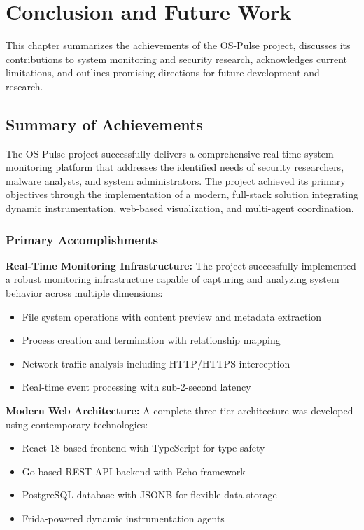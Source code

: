 \chapter{Conclusion and Future Work}

This chapter summarizes the achievements of the OS-Pulse project, discusses its contributions to system monitoring and security research, acknowledges current limitations, and outlines promising directions for future development and research.

\section{Summary of Achievements}

The OS-Pulse project successfully delivers a comprehensive real-time system monitoring platform that addresses the identified needs of security researchers, malware analysts, and system administrators. The project achieved its primary objectives through the implementation of a modern, full-stack solution integrating dynamic instrumentation, web-based visualization, and multi-agent coordination.

\subsection{Primary Accomplishments}

\textbf{Real-Time Monitoring Infrastructure:}
The project successfully implemented a robust monitoring infrastructure capable of capturing and analyzing system behavior across multiple dimensions:
\begin{itemize}
    \item File system operations with content preview and metadata extraction
    \item Process creation and termination with relationship mapping
    \item Network traffic analysis including HTTP/HTTPS interception
    \item Real-time event processing with sub-2-second latency
\end{itemize}

\textbf{Modern Web Architecture:}
A complete three-tier architecture was developed using contemporary technologies:
\begin{itemize}
    \item React 18-based frontend with TypeScript for type safety
    \item Go-based REST API backend with Echo framework
    \item PostgreSQL database with JSONB for flexible data storage
    \item Frida-powered dynamic instrumentation agents
\end{itemize}


